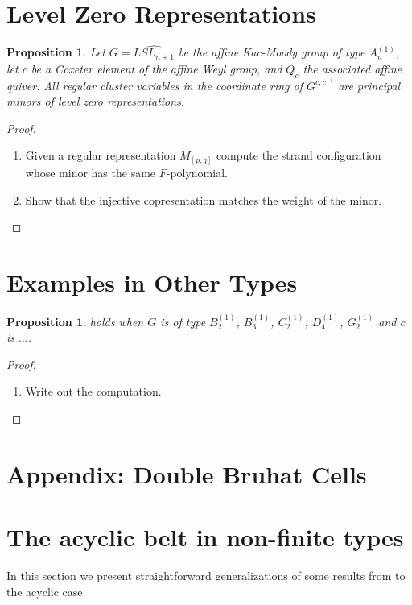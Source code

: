 \documentclass[12pt]{amsart}
\newtheorem{proposition}[theorem]{Proposition}
\numberwithin{equation}{section}
\begin{document}
\section{Level Zero Representations}

\begin{proposition}
Let $G = \widehat{LSL_{n+1}}$ be the affine Kac-Moody group of type $A_n^{(1)}$, let $c$ be a Coxeter element of the affine Weyl group, and $Q_c$ the associated affine quiver.  All regular cluster variables in the coordinate ring of $G^{c,c^{-1}}$ are principal minors of level zero representations.  
\end{proposition}
\begin{proof}
\begin{enumerate}
\item Given a regular representation $M_{[p,q]}$ compute the strand configuration whose minor has the same $F$-polynomial.
\item Show that the injective copresentation matches the weight of the minor.
\end{enumerate}
\end{proof}

\section{Examples in Other Types}\label{sec:othertypes}

\begin{proposition}
 holds when $G$ is of type $B_2^{(1)}$, $B_3^{(1)}$, $C_2^{(1)}$, $D_4^{(1)}$, $G_2^{(1)}$ and $c$ is $\dotsc$. 
\end{proposition}
\begin{proof}
\begin{enumerate}
\item Write out the computation.
\end{enumerate}
\end{proof}

\section{Appendix: Double Bruhat Cells}

\section{The acyclic belt in non-finite types}
In this section we present straightforward generalizations of some results from \cite[Sections 8-10]{FZ07} to the acyclic case.
\end{document}

